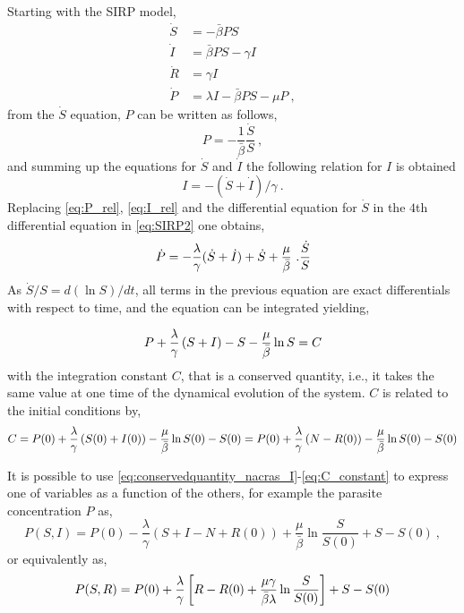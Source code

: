 Starting with the SIRP model,
\begin{equation}\label{eq:SIRP2}
    \begin{aligned}
        \dot{S} & =-\bar{\beta} P S                    \\
        \dot{I} & =\bar{\beta} P S-\gamma I            \\
        \dot{R} & =\gamma I                            \\
        \dot{P} & =\lambda I-\bar{\beta}P S -\mu P \ ,
    \end{aligned}
\end{equation}
from the $\dot{S}$ equation, $P$ can be written as follows,
\begin{equation}\label{eq:P_rel}
    P=-\frac{1}{\bar{\beta}}\frac{\dot{S}}{S} \ ,
\end{equation}
and summing up the equations for $\dot{S}$ and $\dot{I}$ the following
relation for $I$ is obtained
\begin{equation}\label{eq:I_rel}
    I=-(\dot{S}+\dot{I})/\gamma \ .
\end{equation}
Replacing \cref{eq:P_rel}, \cref{eq:I_rel} and the differential equation
for $\dot{S}$ in the $4$th differential equation in \cref{eq:SIRP2} one
obtains,
\begin{equation}
    \dot{P}=-{{\lambda}\over{\gamma}} (\dot{S}+\dot{I})+\dot{S}+
    {{\mu}\over{\bar{\beta}}}\ . {{\dot{S}}\over{S}}
\end{equation}
As $\dot{S}/S=d(\ln S)/dt$, all terms in the previous equation are exact
differentials with respect to time, and the equation can be integrated
yielding,

\begin{equation}
    P + \frac{\lambda}{\gamma}\left(S+I\right)-S-\frac{\mu}{\bar{\beta}}\ln S=C
    \label{eq:conservedquantity_nacras_I}
\end{equation}
with the integration constant $C$,
that is a conserved quantity, i.e., it takes the same value at one time of
the dynamical evolution of the system.
$C$ is related to the initial conditions by,
\begin{equation}
    C = P(0)+\frac{\lambda}{\gamma}\left(S(0)+I(0)\right) -
    \frac{\mu}{\bar{\beta}}\ln{S(0)} -
    S(0)=P(0)+\frac{\lambda}{\gamma}\left(N-R(0)\right) -
    \frac{\mu}{\bar{\beta}}\ln{S(0)} - S(0)
    \label{eq:C_constant}
\end{equation}

It is possible to use \cref{eq:conservedquantity_nacras_I}-\cref{eq:C_constant} to
express one of variables as a function of the others, for example
the parasite concentration $P$ as,
\begin{equation} \label{eq:PSI_exact}
    P(S, I)=P(0)-\frac{\lambda}{\gamma}\left(S+I-N+R(0)\right)+
    \frac{\mu}{\bar{\beta}}\ln{\frac{S}{S(0)}} + S - S(0)\ ,
\end{equation}
or equivalently as,
\begin{equation}\label{eq:psrexact}
    P(S,R)=P(0) + \frac{\lambda}{\gamma}\left[R-R(0)+
        \frac{\mu\gamma}{\bar{\beta}\lambda}\ln{\frac{S}{S(0)}}\right] + S - S(0)
\end{equation}


